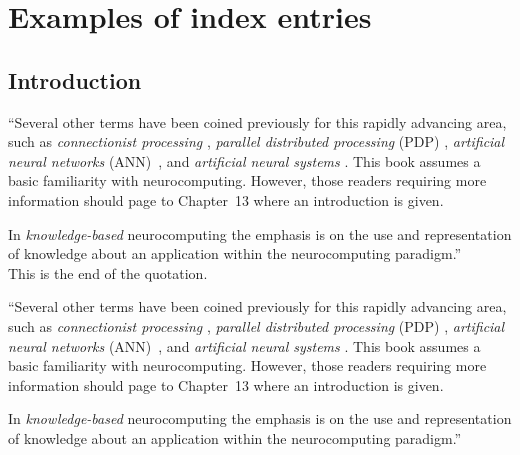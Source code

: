\appendix
\setcounter{chapter}{1}
\renewcommand{\chaptermark}[1]%
	{\markboth{Appendix \thechapter. #1}{}}
\chapter{Examples of index entries}
\label{appendixB}

\section{Introduction} %

``Several other terms have 
been coined previously for this rapidly advancing area, such as 
\emph{connectionist processing} 
\citep{shas95}, 
\emph{parallel distributed processing}
(PDP) \citep{rume86},
\emph{artificial neural networks}
(ANN)~\citep{hass95,roja96},
and 
\emph{artificial neural systems}
\citep{zurada92}.
This book assumes a basic familiarity with neurocomputing. However, 
those readers requiring more information should page to Chapter~13 
where an introduction is given.

In \emph{knowledge-based}  neurocomputing the emphasis is on the use 
and representation of knowledge about an application within the 
neurocomputing paradigm.''\\

This is the end of the quotation.

``Several other terms have 
been coined previously for this rapidly advancing area, such as 
\emph{connectionist processing} 
\citep{shas95}, 
\emph{parallel distributed processing}
(PDP) \citep{rume86},
\emph{artificial neural networks}
(ANN)~\citep{hass95,roja96},
and 
\emph{artificial neural systems}
\citep{zurada92}.
This book assumes a basic familiarity with neurocomputing. However, 
those readers requiring more information should page to Chapter~13 
where an introduction is given.

In \emph{knowledge-based}  neurocomputing the emphasis is on the use 
and representation of knowledge about an application within the 
neurocomputing paradigm.''\\

